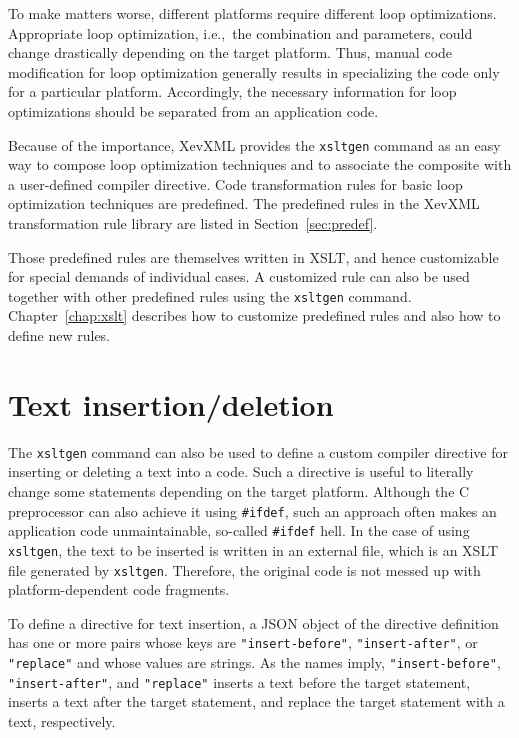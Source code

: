 To make matters worse, different platforms require different loop
optimizations.  Appropriate loop optimization, i.e.,~the combination and
parameters, could change drastically depending on the target platform.
Thus, manual code modification for loop optimization generally results
in specializing the code only for a particular platform. Accordingly,
the necessary information for loop optimizations should be separated
from an application code.

Because of the importance, XevXML provides the \texttt{xsltgen} command
as an easy way to compose loop optimization techniques and to associate
the composite with a user-defined compiler directive.  Code
transformation rules for basic loop optimization techniques are
predefined. The predefined rules in the XevXML transformation rule
library are listed in Section~\ref{sec:predef}.


Those predefined rules are themselves written in XSLT, and hence
customizable for special demands of individual cases. A customized rule
can also be used together with other predefined rules using the
\texttt{xsltgen} command. Chapter~\ref{chap:xslt} describes how to
customize predefined rules and also how to define new rules.


\section{Text insertion/deletion}
The \texttt{xsltgen} command can also be used to define a custom
compiler directive for inserting or deleting a text into a code. Such a
directive is useful to literally change some statements depending on the
target platform.  Although the C preprocessor can also achieve it using
\texttt{\#ifdef}, such an approach often makes an application code
unmaintainable, so-called \texttt{\#ifdef} hell. In the case of using
\texttt{xsltgen}, the text to be inserted is written in an external
file, which is an XSLT file generated by \texttt{xsltgen}.  Therefore,
the original code is not messed up with platform-dependent code
fragments.

To define a directive for text insertion, a JSON object of the directive
definition has one or more pairs whose keys are
\texttt{"insert-before"}, \texttt{"insert-after"}, or \texttt{"replace"}
and whose values are strings. As the names imply,
\texttt{"insert-before"}, \texttt{"insert-after"}, and
\texttt{"replace"} inserts a text before the target statement, inserts a
text after the target statement, and replace the target statement with a
text, respectively.

